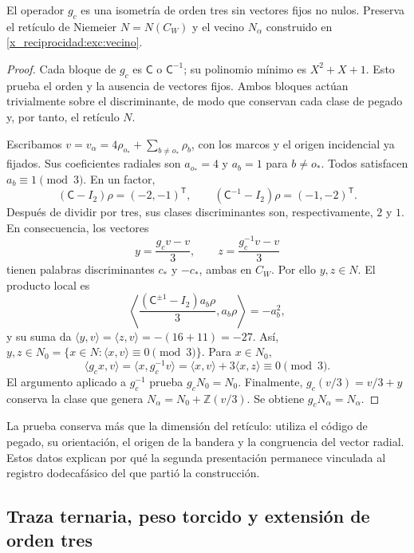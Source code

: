 \begin{proposition}
\label{x_reciprocidad:km:estabilidad-vecino}
El operador \(g_c\) es una isometría de orden tres sin vectores fijos
no nulos. Preserva el retículo de Niemeier \(N=N(C_W)\) y el vecino
\(N_\alpha\) construido en \eqref{x_reciprocidad:exc:vecino}.
\end{proposition}
\begin{proof}
Cada bloque de \(g_c\) es \(\mathsf C\) o \(\mathsf C^{-1}\);
su polinomio mínimo es \(X^2+X+1\). Esto prueba el orden y la
ausencia de vectores fijos. Ambos bloques actúan trivialmente sobre el
discriminante, de modo que conservan cada clase de pegado y, por tanto,
el retículo \(N\).

Escribamos \(v=v_\alpha=4\rho_{o_*}+\sum_{b\ne o_*}\rho_b\),
con los marcos y el origen incidencial ya fijados. Sus coeficientes
radiales son \(a_{o_*}=4\) y \(a_b=1\) para \(b\ne o_*\).
Todos satisfacen \(a_b\equiv1\pmod3\). En un factor,
\[
 (\mathsf C-I_2)\rho=(-2,-1)^{\mathsf T},\qquad
 (\mathsf C^{-1}-I_2)\rho=(-1,-2)^{\mathsf T}.
\]
Después de dividir por tres, sus clases discriminantes son,
respectivamente, \(2\) y \(1\). En consecuencia, los vectores
\begin{equation}
 y=\frac{g_cv-v}{3},\qquad z=\frac{g_c^{-1}v-v}{3}
 \label{x_reciprocidad:km:desplazamientos}
\end{equation}
tienen palabras discriminantes \(c_*\) y \(-c_*\), ambas en
\(C_W\). Por ello \(y,z\in N\). El producto local es
\[
 \left\langle
 \frac{(\mathsf C^{\pm1}-I_2)a_b\rho}{3},a_b\rho
 \right\rangle=-a_b^2,
\]
y su suma da
\(\langle y,v\rangle=\langle z,v\rangle=-(16+11)=-27\).
Así, \(y,z\in N_0=\{x\in N:\langle x,v\rangle\equiv0\pmod3\}\).
Para \(x\in N_0\),
\[
 \langle g_cx,v\rangle
 =\langle x,g_c^{-1}v\rangle
 =\langle x,v\rangle+3\langle x,z\rangle\equiv0\pmod3.
\]
El argumento aplicado a \(g_c^{-1}\) prueba \(g_cN_0=N_0\).
Finalmente, \(g_c(v/3)=v/3+y\) conserva la clase que genera
\(N_\alpha=N_0+\mathbb Z(v/3)\). Se obtiene
\(g_cN_\alpha=N_\alpha\).
\end{proof}

La prueba conserva más que la dimensión del retículo: utiliza el código
de pegado, su orientación, el origen de la bandera y la congruencia del
vector radial. Estos datos explican por qué la segunda presentación
permanece vinculada al registro dodecafásico del que partió la construcción.

\subsection{Traza ternaria, peso torcido y extensión de orden tres}
\label{x_reciprocidad:km:orbifold-tres}

